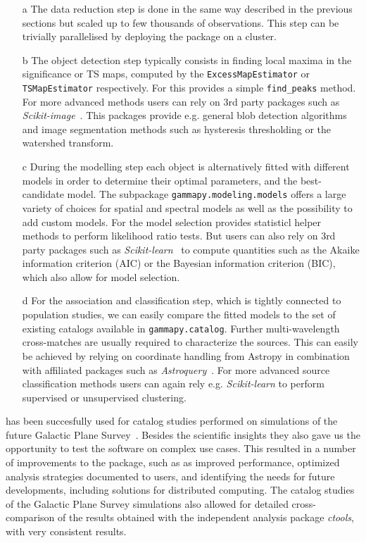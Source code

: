 \documentclass[longauth]{aa}
\newcommand{\code}[1]{\texttt{#1}}
\begin{document}
\begin{itemize}
	\item[a] The \iacts data reduction step is done in the same way described in the 
	previous sections but scaled up to few thousands of observations. This step can be
	trivially parallelised by deploying the \gammapy package on a cluster.
	\item[b] The object detection step typically consists in finding local maxima
	in the significance or TS maps, computed by the \code{ExcessMapEstimator} or
	\code{TSMapEstimator} respectively. For this \gammapy provides a simple \code{find\_peaks}
	method. For more advanced methods users can rely on 3rd party packages such as
	\textit{Scikit-image}~\citep{scikit-image}. This packages provide e.g. general
	blob detection algorithms and image segmentation methods such as hysteresis thresholding
	or the watershed transform. 	
	\item[c] During the modelling step each object is alternatively fitted with different
	models in order to determine their optimal parameters, and the best-candidate model. The
	subpackage \code{gammapy.modeling.models} offers a large variety of choices for spatial
	and spectral models as well as the possibility to add custom models. For the model selection
	\gammapy provides statisticl helper methods to perform likelihood ratio tests.
	But users can also rely on 3rd party packages such as \textit{Scikit-learn}~\citep{scikit-learn}
	to compute quantities such as the Akaike information criterion (AIC) or the Bayesian
	information criterion (BIC), which also allow for model selection.
	\item[d] For the association and classification step, which is tightly connected to
	population studies, we can easily compare the fitted models to the set of
	existing \gammaray catalogs available in \code{gammapy.catalog}. Further
	multi-wavelength cross-matches are usually required to characterize the
	sources. This can easily be achieved by relying on coordinate
	handling from Astropy in combination with affiliated packages such as
	\textit{Astroquery}~\citep{astroquery}. For more advanced source classification
	methods users can again rely e.g. \textit{Scikit-learn} to perform supervised
	or unsupervised clustering.
\end{itemize}

\gammapy has been succesfully used for catalog studies performed on simulations
of the future \cta Galactic Plane Survey~\citep{Remy2021}. Besides the scientific
insights they also gave us the opportunity to test the \gammapy software on complex
use cases. This resulted in a number of improvements to the \gammapy package, such as
as improved performance, optimized analysis strategies documented to users, and
identifying the needs for future developments, including solutions for distributed
computing. The catalog studies of the \cta Galactic Plane Survey simulations
also allowed for detailed cross-comparison of the results obtained with the independent
\gammaray analysis package \textit{ctools}\citep{2016A&A...593A...1K}, with very consistent 
results.
\end{document}
